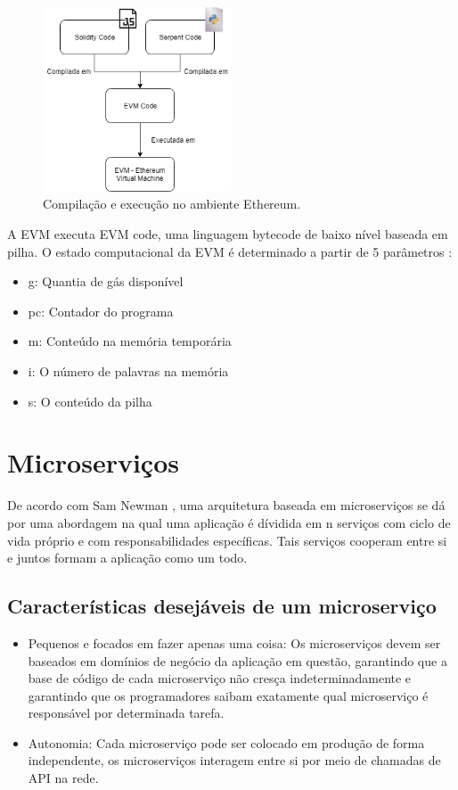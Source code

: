 \begin{figure}[ht]
\centering
\includegraphics[width=0.5\textwidth]{Cap1/ethereum_compilation_and_execution}
\caption{Compilação e execução no ambiente Ethereum.}
\label{ethereum_compilation_and_execution}
\end{figure}

A EVM executa EVM code, uma linguagem bytecode de baixo nível baseada em pilha. O estado computacional da EVM é determinado a partir de 5 parâmetros \cite{ethereum_yellow_paper}:

\begin{itemize}
\item g: Quantia de gás disponível
\item pc: Contador do programa
\item m: Conteúdo na memória temporária
\item i: O número de palavras na memória
\item s: O conteúdo da pilha
\end{itemize}

\section{Microserviços}

De acordo com Sam Newman \cite{building_microservices}, uma arquitetura baseada em microserviços se dá por uma abordagem na qual uma aplicação é dívidida em n serviços com ciclo de vida próprio e com responsabilidades específicas. Tais serviços cooperam entre si e juntos formam a aplicação como um todo.

\subsection{Características desejáveis de um microserviço}

\begin{itemize}
\item Pequenos e focados em fazer apenas uma coisa: Os microserviços devem ser baseados em domínios de negócio da aplicação em questão, garantindo que a base de código de cada microserviço não cresça indeterminadamente e garantindo que os programadores saibam exatamente qual microserviço é responsável por determinada tarefa.
\item Autonomia: Cada microserviço pode ser colocado em produção de forma independente, os microserviços interagem entre si por meio de chamadas de API na rede.
\end{itemize}


